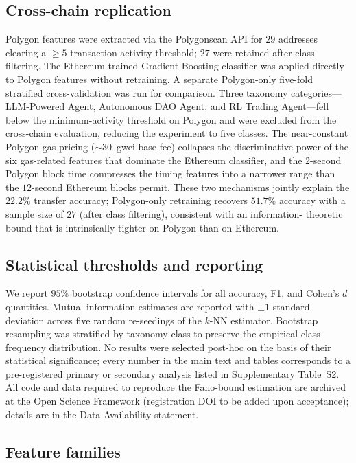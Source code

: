\documentclass[11pt,a4paper]{article}
\begin{document}
\subsection*{Cross-chain replication}

Polygon features were extracted via the Polygonscan API for $29$ addresses clearing a $\geq 5$-transaction activity threshold; $27$ were retained after class filtering. The
Ethereum-trained Gradient Boosting classifier was applied directly to
Polygon features without retraining. A separate Polygon-only five-fold
stratified cross-validation was run for comparison. Three taxonomy
categories---LLM-Powered Agent, Autonomous DAO Agent, and RL Trading
Agent---fell below the minimum-activity threshold on Polygon and were
excluded from the cross-chain evaluation, reducing the experiment to
five classes. The near-constant Polygon gas pricing ($\sim 30$~gwei base
fee) collapses the discriminative power of the six gas-related features
that dominate the Ethereum classifier, and the $2$-second Polygon block
time compresses the timing features into a narrower range than the
$12$-second Ethereum blocks permit. These two mechanisms jointly explain
the $22.2\%$ transfer accuracy; Polygon-only retraining recovers $51.7\%$
accuracy with a sample size of $27$ (after class filtering), consistent with an information-
theoretic bound that is intrinsically tighter on Polygon than on
Ethereum.

\subsection*{Statistical thresholds and reporting}

We report $95\%$ bootstrap confidence intervals\cite{efron1979bootstrap}
for all accuracy, F1, and Cohen's $d$ quantities. Mutual information
estimates are reported with $\pm 1$ standard deviation across five
random re-seedings of the $k$-NN estimator. Bootstrap resampling was
stratified by taxonomy class to preserve the empirical class-frequency
distribution. No results were selected post-hoc on the basis of their
statistical significance; every number in the main text and tables
corresponds to a pre-registered primary or secondary analysis listed in
Supplementary Table~S2. All code and data required to reproduce the
Fano-bound estimation are archived at the Open Science Framework
(registration DOI to be added upon acceptance); details are in the Data
Availability statement.

\subsection*{Feature families}
\end{document}
